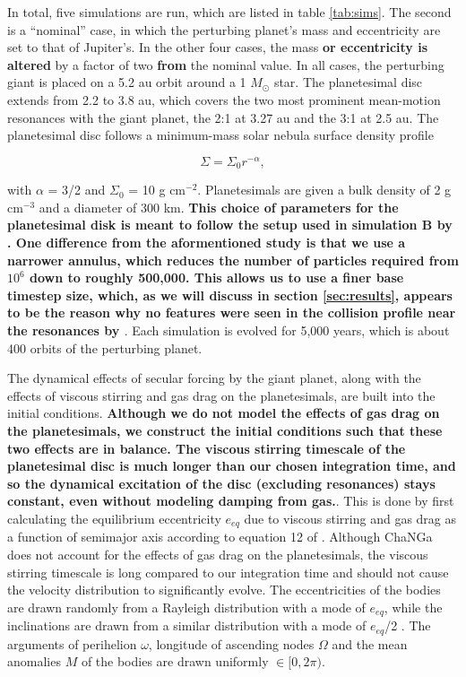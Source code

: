 \documentclass[fleqn,usenatbib]{mnras}
\begin{document}
In total, five simulations are run, which are listed in table
\ref{tab:sims}. The second
is a ``nominal'' case, in which the perturbing planet's mass and 
eccentricity are set to that of Jupiter's. In the other four cases, the mass \textbf{or eccentricity is altered} by a factor of two \textbf{from} the nominal value. In all cases, the perturbing giant is placed on a 5.2 au orbit around a 1 $M_{\odot}$ star. The 
planetesimal disc extends from 2.2 to 3.8 au, which covers the two most prominent mean-motion resonances with the giant planet, the 2:1 at 3.27 au 
and the 3:1 at 2.5 au. The planetesimal disc follows a minimum-mass solar nebula surface density profile \citep{1981PThPS..70...35H}

\begin{equation}\label{eq:surf_den}
	\Sigma = \Sigma_{0} r^{-\alpha},
\end{equation}

\noindent with $\alpha$ = 3/2 and $\Sigma_{0}$ = 10 g cm$^{-2}$. Planetesimals are given a bulk density of 2 g cm$^{-3}$ and a diameter of 
300 km. \textbf{This choice of parameters for the planetesimal disk is meant to follow the setup used in simulation B by \citet{2000Icar..143...45R}. One difference from the aformentioned study is that we use a narrower annulus, which reduces the number of particles required from $10^6$ down to roughly 500,000. This allows us to use a finer base timestep size, which, as we will discuss in section \ref{sec:results}, appears to be the reason why no features were seen in the collision profile near the resonances by \citet{2000Icar..143...45R}}. Each simulation is evolved for 5,000 years, which is about 400 orbits 
of the perturbing planet.

The dynamical effects of secular forcing by the giant planet, along with  the effects of viscous stirring and gas drag on the planetesimals, are 
built into the initial conditions. \textbf{Although we do not model the effects of gas drag on the planetesimals, we construct the initial conditions such that these two effects are in balance. The viscous stirring timescale of the planetesimal disc is much longer than our chosen integration time, and so the dynamical excitation of the disc (excluding resonances) stays constant, even without modeling damping from gas.}. This is done by first calculating the equilibrium eccentricity $e_{eq}$ due to viscous stirring and gas drag as a 
function of semimajor axis according to equation 12 of \citet{2002ApJ...581..666K}. Although {\sc ChaNGa} does not account for the effects of 
gas drag on the planetesimals, the viscous stirring timescale is long compared to our integration time and should not cause the velocity 
distribution to significantly evolve. The eccentricities of the bodies are drawn randomly from a Rayleigh distribution with a mode of $e_{eq}$, 
while the inclinations are drawn from a similar distribution with a mode of $e_{eq}$/2 \citep{1993MNRAS.263..875I}. The arguments of perihelion 
$\omega$, longitude of ascending nodes $\Omega$ and the mean anomalies $M$ of the bodies are drawn uniformly $\in [0, 2 \pi)$.
\end{document}
